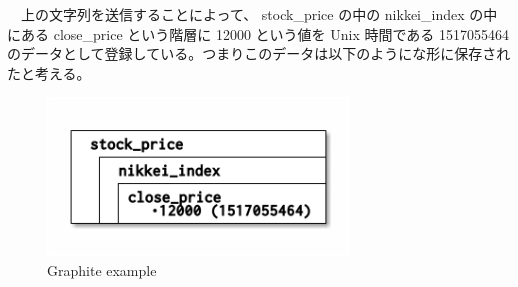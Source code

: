\documentclass{scrartcl}
\begin{document}
　上の文字列を送信することによって、 stock\_price の中の nikkei\_index の中にある close\_price という階層に 12000 という値を Unix 時間である 1517055464 のデータとして登録している。つまりこのデータは以下のようにな形に保存されたと考える。\\

\begin{figure}[htbp]
\centering
\includegraphics[width=8cm]{hoge.png}
\caption{Graphite example}
\end{figure}
\end{document}
